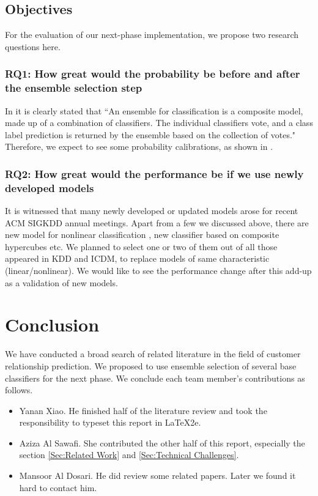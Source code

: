 \documentclass[journal]{IEEEtran}
\begin{document}
\subsection{Objectives}
For the evaluation of our next-phase implementation, we propose two research questions here.
\subsubsection{\textbf{RQ1: How great would the probability be before and after the ensemble selection step}}
In \cite{Ref:DataMiningConceptsandTechniques} it is clearly stated that ``An ensemble for classification is a composite model, made up of a combination of classifiers. The individual classifiers vote, and a class label prediction is returned by the ensemble based on the collection of votes." Therefore, we expect to see some probability calibrations, as shown in \cite{Ref:EnsembleSelectionFromLibraryOfModels}.

\subsubsection{\textbf{RQ2: How great would the performance be if we use newly developed models}}
It is witnessed that many newly developed or updated models arose for recent ACM SIGKDD annual meetings. Apart from a few we discussed above, there are new model for nonlinear classification \cite{Ref:TradingRepresentabilityforScalability}, new classifier based on composite hypercubes \cite{Ref:ANewClassifierBasedOnCompositeHypercubes} etc. We planned to select one or two of them out of all those appeared in KDD and ICDM, to replace models of same characteristic (linear/nonlinear). We would like to see the performance change after this add-up as a validation of new models.


\section{Conclusion}\label{Sec:Conclusion}
We have conducted a broad search of related literature in the field of customer relationship prediction. We proposed to use ensemble selection of several base classifiers for the next phase. We conclude each team member's contributions as follows.
\begin{itemize}
  \item Yanan Xiao. He finished half of the literature review and took the responsibility to typeset this report in \LaTeX2e.
  \item Aziza Al Sawafi. She contributed the other half of this report, especially the section \ref{Sec:Related Work} and \ref{Sec:Technical Challenges}.
  \item Mansoor Al Dosari. He did review some related papers. Later we found it hard to contact him.
\end{itemize}
\end{document}
